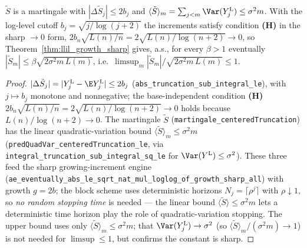 \begin{lemma}\label{lem:hw_low_H}
\leanok
{}
$\tilde S$ is a martingale with $|\Delta\tilde S_j|\le2b_j$ and $\langle\tilde
S\rangle_m=\sum_{j<m}\Var(Y_j^{\mathrm L})\le\sigma^2 m$. With the log-level cutoff
$b_j=\sqrt{j/\log(j+2)}$ the increments satisfy condition \textbf{(H)} in the sharp
$\to0$ form, $2b_n\sqrt{L(n)/n}=2\sqrt{L(n)/\log(n+2)}\to0$, so
Theorem~\ref{thm:llil_growth_sharp} gives, a.s., for every $\beta>1$ eventually
$|\tilde S_m|\le\beta\sqrt{2\sigma^2 m\,L(m)}$, i.e.\
$\limsup_m|\tilde S_m|/\sqrt{2\sigma^2 m\,L(m)}\le1$.
\end{lemma}
\begin{proof}\leanok
$|\Delta\tilde S_j|=|Y_j^{\mathrm L}-\E Y_j^{\mathrm L}|\le2b_j$
(\texttt{abs\_truncation\_sub\_integral\_le}), with $j\mapsto b_j$ monotone and
nonnegative; the base-independent condition \textbf{(H)} $2b_n\sqrt{L(n)/n}=
2\sqrt{L(n)/\log(n+2)}\to0$ holds because $L(n)/\log(n+2)\to0$. The martingale $\tilde S$
(\texttt{martingale\_centeredTruncation}) has the linear quadratic-variation bound
$\langle\tilde S\rangle_m\le\sigma^2 m$ (\texttt{predQuadVar\_centeredTruncation\_le}, via
\texttt{integral\_truncation\_sub\_integral\_sq\_le} for $\Var(Y^{\mathrm L})\le\sigma^2$).
These three feed the sharp growing-increment engine
(\texttt{ae\_eventually\_abs\_le\_sqrt\_nat\_mul\_loglog\_of\_growth\_sharp\_all}) with growth
$g=2b$; the block scheme uses deterministic horizons $N_j=\lceil\rho^j\rceil$ with $\rho\downarrow1$,
so \emph{no random stopping time} is needed --- the linear bound $\langle\tilde S\rangle\le\sigma^2 m$
lets a deterministic time horizon play the role of quadratic-variation stopping. The upper bound uses
only $\langle\tilde S\rangle_m\le\sigma^2 m$; that $\Var(Y_j^{\mathrm L})\to\sigma^2$ (so
$\langle\tilde S\rangle_m/(\sigma^2 m)\to1$) is not needed for $\limsup\le1$, but confirms the
constant is sharp.
\end{proof}

